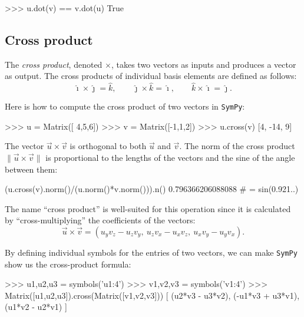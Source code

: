 \small
\begin{verbatimtab}
>>> u.dot(v) == v.dot(u)
True
\end{verbatimtab}
\normalsize





\subsection{Cross product}
\label{vectors:cross_product}

The \emph{cross product}, denoted $\times$, takes two vectors as inputs and produces a vector as output.
The cross products of individual basis elements are defined as follows:
\[
 \hat{\imath}\times\hat{\jmath} =\hat{k}, \qquad
 \hat{\jmath}\times\hat{k} =\hat{\imath}, \qquad
 \hat{k}\times \hat{\imath}= \hat{\jmath}.
\]

\noindent
Here is how to compute the cross product of two vectors in \texttt{SymPy}:
\small
\begin{verbatimtab}
>>> u = Matrix([ 4,5,6])
>>> v = Matrix([-1,1,2])
>>> u.cross(v)
[4, -14, 9]
\end{verbatimtab}
\normalsize

\noindent
The vector $\vec{u}\times \vec{v}$ is orthogonal to both $\vec{u}$ and $\vec{v}$.
The norm of the cross product  $\|\vec{u}\times \vec{v}\|$ is proportional to the lengths of the vectors 
and the sine of the angle between them:
\small
\begin{verbatimtab}
(u.cross(v).norm()/(u.norm()*v.norm())).n()
0.796366206088088    # = sin(0.921..) 
\end{verbatimtab}
\normalsize

\noindent
The name ``cross product'' is well-suited for this operation
since it is calculated by ``cross-multiplying'' the coefficients of the vectors:
\[
   \vec{u}\times\vec{v}=
   \left( 
     u_yv_z-u_zv_y, \ u_zv_x-u_xv_z, \ u_xv_y-u_yv_x 
    \right).
\]

\noindent
By defining individual symbols for the entries of two vectors,
we can make \texttt{SymPy} show us the cross-product formula:
\small
\begin{verbatimtab}
>>> u1,u2,u3 = symbols('u1:4')
>>> v1,v2,v3 = symbols('v1:4')
>>> Matrix([u1,u2,u3]).cross(Matrix([v1,v2,v3]))
[ (u2*v3 - u3*v2), (-u1*v3 + u3*v1), (u1*v2 - u2*v1) ]
\end{verbatimtab}
\normalsize

